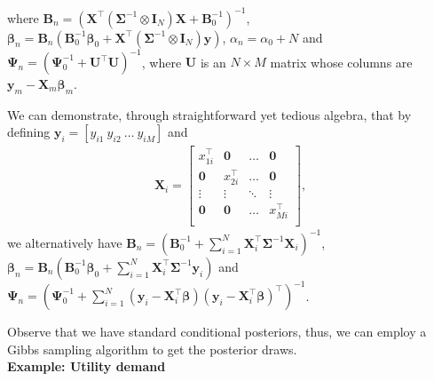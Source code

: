 where $\bm{B}_n=(\bm{X}^{\top}(\bm{\Sigma}^{-1}\otimes \bm{I}_N )\bm{X}+\bm{B}_0^{-1})^{-1}$, $\bm{\beta}_n=\bm{B}_n(\bm{B}_0^{-1}\bm{\beta}_0 + \bm{X}^{\top}(\bm{\Sigma}^{-1}\otimes \bm{I}_N)\bm{y})$, $\alpha_n = \alpha_0 + N$ and $\bm{\Psi}_n = (\bm{\Psi}_0^{-1} + \bm{U}^{\top}\bm{U})^{-1}$, where $\bm{U}$ is an $N\times M$ matrix whose columns are $\bm{y}_m-\bm{X}_m\bm{\beta}_m$. 

We can demonstrate, through straightforward yet tedious algebra, that by defining $\bm{y}_i = [y_{i1} \ y_{i2} \ \dots \ y_{iM}]$ and
\begin{align*}
	\bm{X}_i=\begin{bmatrix}
		x_{1i}^{\top} & \bm{0} & \dots & \bm{0}\\
		\bm{0} & x_{2i}^{\top} & \dots & \bm{0}\\
		\vdots & \vdots & \ddots & \vdots\\
		\bm{0} & \bm{0} & \dots & x_{Mi}^{\top}\\
	\end{bmatrix},
\end{align*} 
we alternatively have $\bm{B}_n=(\bm{B}_0^{-1}+\sum_{i=1}^N \bm{X}_i^{\top}\bm{\Sigma}^{-1}\bm{X}_i)^{-1}$, $\bm{\beta}_n=\bm{B}_n(\bm{B}_0^{-1}\bm{\beta}_0+\sum_{i=1}^N \bm{X}_i^{\top}\bm{\Sigma}^{-1}\bm{y}_i)$ and $\bm{\Psi}_n = (\bm{\Psi}_0^{-1} + \sum_{i=1}^N (\bm{y}_i-\bm{X}_i^{\top}\bm{\beta}) (\bm{y}_i-\bm{X}_i^{\top}\bm{\beta})^{\top})^{-1}$.

Observe that we have standard conditional posteriors, thus, we can employ a Gibbs sampling algorithm to get the posterior draws.\\

\textbf{Example: Utility demand}

